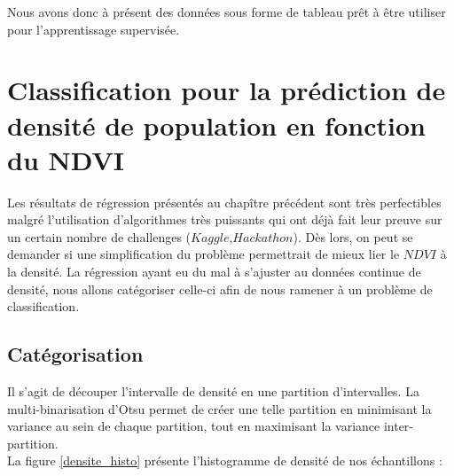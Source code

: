 \documentclass{book}
\begin{document}
\clearpage

Nous avons donc à présent des données sous forme de tableau prêt à être utiliser pour l'apprentissage supervisée.

\chapter{Classification pour la prédiction de densité de population en fonction du NDVI}

Les résultats de régression présentés au chapître précédent sont très perfectibles malgré l'utilisation d'algorithmes très puissants qui ont déjà fait leur
preuve sur un certain nombre de challenges ($Kaggle$,$Hackathon$). Dès lors, on peut se demander si une simplification du problème permettrait de mieux lier
le $NDVI$ à la densité. La régression ayant eu du mal à s'ajuster au données continue de densité, nous allons catégoriser celle-ci afin de nous ramener à un
problème de classification.

\section{Catégorisation}
Il s'agit de découper l'intervalle de densité en une partition d'intervalles. La multi-binarisation d'Otsu permet de créer une telle partition en
minimisant la variance au sein de chaque partition, tout en maximisant la variance inter-partition.\\
La figure \ref{densite_histo} présente l'histogramme de densité de nos échantillons :
\end{document}

